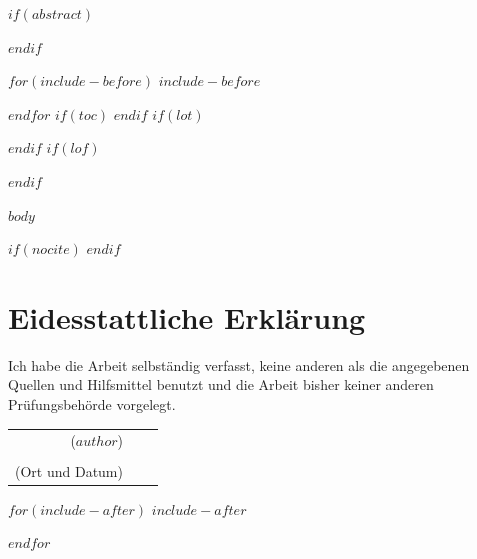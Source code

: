 \documentclass[$if(fontsize)$$fontsize$,$endif$$if(lang)$$lang$,$endif$$if(papersize)$$papersize$,$endif$$for(classoption)$$classoption$$sep$,$endfor$]{$documentclass$}
\makeatletter
\newif \if@mainmatter \@mainmattertrue
\newcommand*\mainmatter{\clearpage\thispagestyle{plain}\@mainmattertrue\pagenumbering{arabic}}
\newcommand*\backmatter{\clearpage\thispagestyle{plain}\@mainmatterfalse}
\makeatother
\begin{document}
$if(abstract)$
\begin{abstract}
$abstract$
\end{abstract}
$endif$

$for(include-before)$
$include-before$

$endfor$
$if(toc)$
{
\hypersetup{linkcolor=black}
\setcounter{tocdepth}{$toc-depth$}
\thispagestyle{plain}
\tableofcontents
}
$endif$
$if(lot)$
\listoftables
$endif$
$if(lof)$
\listoffigures
$endif$

\mainmatter
$body$

$if(nocite)$
\nocite{*}
$endif$

\backmatter
\printbibheading[title={Quellen}]

\printbibliography[notkeyword=film,heading=subbibintoc,title={Literaturverzeichnis}]

\printbibliography[keyword=film,heading=subbibintoc,title={Filmverzeichnis}]


\clearpage
\thispagestyle{plain}
\markboth{}{}
\section*{Eidesstattliche Erklärung}


Ich habe die Arbeit selbständig verfasst, keine anderen als die angegebenen 
Quellen und Hilfsmittel benutzt und die Arbeit bisher keiner anderen
Prüfungsbehörde vorgelegt.

\vspace{1cm}

  \begin{center}
  \begin{tabular}{ r c l }
  ($author$)         &  & \dotfill                                     \\
                     &  & \parbox[t]{8cm}{\strut}                      \\
  (Ort und Datum)    &  & \dotfill                                     \\
  \end{tabular}
  \end{center}



$for(include-after)$
$include-after$

$endfor$
\end{document}
